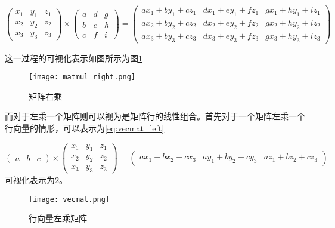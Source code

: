 \begin{equation}
  \begin{pmatrix}
    x_1 & y_1 & z_1\\
    x_2 & y_2 & z_2\\  
    x_3 & y_3 & z_3
  \end{pmatrix}
  \times 
  \begin{pmatrix}
    a & d & g\\
    b & e & h\\
    c & f & i
  \end{pmatrix}
  = 
  \begin{pmatrix}
    ax_1 + by_1 + cz_1 & dx_1 + ey_1 + fz_1 & gx_1 + hy_1 + iz_1 \\
    ax_2 + by_2 + cz_2 & dx_2 + ey_2 + fz_2 & gx_2 + hy_2 + iz_2 \\
    ax_3 + by_3 + cz_3 & dx_3 + ey_3 + fz_3 & gx_3 + hy_3 + iz_3
  \end{pmatrix}
\end{equation}

这一过程的可视化表示如图所示为图\ref{fig:matmul_right}

\begin{figure}
\centering
\texttt{[image: matmul\_right.png]}
\caption{矩阵右乘}
\label{fig:matmul_right}
\end{figure}

而对于左乘一个矩阵则可以视为是矩阵行的线性组合。首先对于一个矩阵左乘一个行向量的情形，可以表示为\ref{eq:vecmat_left}

\begin{equation}
  \begin{pmatrix}
    a & b & c
  \end{pmatrix}
  \times
  \begin{pmatrix}
    x_1 & y_1 & z_1 \\
    x_2 & y_2 & z_2 \\
    x_3 & y_3 & z_3 
  \end{pmatrix}
  = 
  \begin{pmatrix}
    ax_1 + bx_2 + cx_3 & ay_1 + by_2 + cy_3 & az_1 + bz_2 + cz_3
  \end{pmatrix}
  \label{eq:vecmat_left}
\end{equation}
可视化表示为\ref{fig:vecmat}。

\begin{figure}
\centering
\texttt{[image: vecmat.png]}
\caption{行向量左乘矩阵}
\label{fig:vecmat}
\end{figure}

